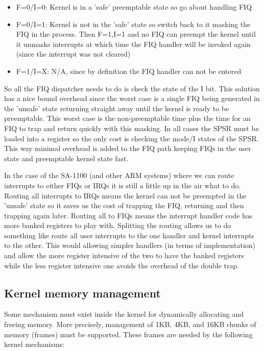 \documentclass[a4paper,10pt,twoside]{article}
\begin{document}
\begin{itemize}
\item F=0/I=0: Kernel is in a 'safe' preemptable state so go about handling FIQ
\item F=0/I=1: Kernel is not in the 'safe' state so switch back to it masking
the FIQ in the process. Then F=1,I=1 and no FIQ can preempt the kernel until
it unmasks interrupts at which time the FIQ handler will be invoked again
(since the interrupt was not cleared)
\item F=1/I=X: N/A, since by definition the FIQ handler can not be entered
\end{itemize}

So all the FIQ dispatcher needs to do is check the state of the I bit. This
solution has a nice bound overhead since the worst case is a single FIQ being
generated in the 'unsafe' state returning straight away until the kernel is
ready to be preemptable. This worst case is the non-preemptable time plus the
time for an FIQ to trap and return quickly with this masking. In all cases
the SPSR must be loaded into a register so the only cost is checking the
mode/I states of the SPSR. This way minimal overhead is added to the FIQ path
keeping FIQs in the user state and preemptable kernel state fast.

In the case of the SA-1100 (and other ARM systems) where we can route
interrupts to either FIQs or IRQs it is still a little up in the air what to
do. Routing all interrupts to IRQs means the kernel can not be preempted in
the 'unsafe' state so it saves us the cost of trapping the FIQ, returning and
then trapping again later. Routing all to FIQs means the interrupt handler
code has more banked registers to play with. Splitting the routing allows us
to do something like route all user interrupts to the one handler and kernel
interrupts to the other. This would allowing simpler handlers (in terms of
implementation) and allow the more register intensive of the two to have the
banked registers while the less register intensive one avoids the overhead of
the double trap.


\subsection{Kernel memory management}
\label{sec:kmem-management}

Some mechanism must exist inside the kernel for dynamically allocating
and freeing memory.  More precisely, management of 1KB, 4KB, and 16KB
chunks of memory (frames) must be supported.  These frames are needed
by the following kernel mechanisms:
\end{document}
